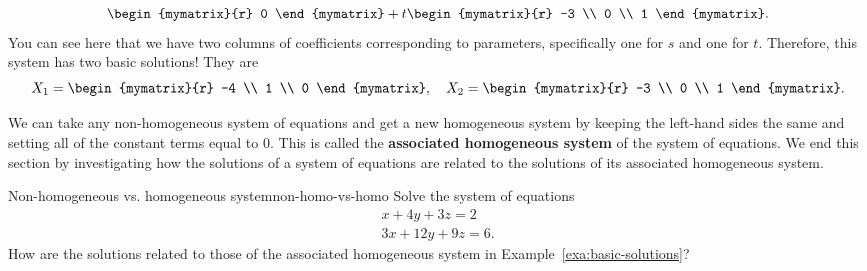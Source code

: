 \begin{solution}
\begin{equation*}
\begin{mymatrix}{r}
      0
    \end{mymatrix}
    +
    t
    \begin{mymatrix}{r}
      -3 \\
      0 \\
      1
    \end{mymatrix}.
  \end{equation*}
  You can see here that we have two columns of coefficients
  corresponding to parameters, specifically one for $s$ and one for $t$.
  Therefore, this system has two basic solutions! They are
  \begin{equation*}
    X_1=
    \begin{mymatrix}{r}
      -4 \\
      1 \\
      0
    \end{mymatrix},\quad X_2 = \begin{mymatrix}{r}
      -3 \\
      0 \\
      1
    \end{mymatrix}.
  \end{equation*}
\end{solution}

We can take any non-homogeneous system of equations and get a new
homogeneous system by keeping the left-hand sides the same and setting
all of the constant terms equal to $0$. This is called the
\textbf{associated homogeneous system}%
%
of the system of equations. We end this section by investigating how
the solutions of a system of equations are related to the solutions of
its associated homogeneous system.

\begin{example}{Non-homogeneous vs. homogeneous system}{non-homo-vs-homo}
  Solve the system of equations
  \begin{equation}\label{eqn:non-homo-vs-homo-1}
    \begin{array}{c}
      x + 4y + 3z = 2 \\
      3x + 12y + 9z = 6.
    \end{array}
  \end{equation}
  How are the solutions related to those of the associated homogeneous
  system in Example~\ref{exa:basic-solutions}?
\end{example}

